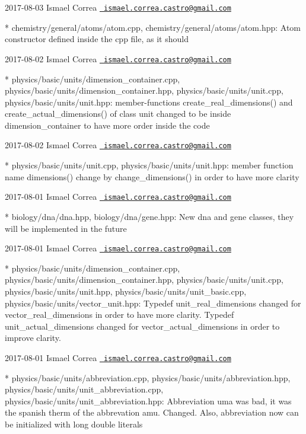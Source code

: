  2017-\/08-\/03 Ismael Correa \href{mailto:ismael.correa.castro@gmail.com}{\texttt{ ismael.\+correa.\+castro@gmail.\+com}} \begin{DoxyVerb}* chemistry/general/atoms/atom.cpp,
chemistry/general/atoms/atom.hpp: Atom constructor defined inside
the cpp file, as it should
\end{DoxyVerb}
 2017-\/08-\/02 Ismael Correa \href{mailto:ismael.correa.castro@gmail.com}{\texttt{ ismael.\+correa.\+castro@gmail.\+com}} \begin{DoxyVerb}* physics/basic/units/dimension_container.cpp,
physics/basic/units/dimension_container.hpp,
physics/basic/units/unit.cpp, physics/basic/units/unit.hpp: 
member-functions create_real_dimensions() and
create_actual_dimensions() of class unit changed to be inside
dimension_container to have more order inside the code
\end{DoxyVerb}
 2017-\/08-\/02 Ismael Correa \href{mailto:ismael.correa.castro@gmail.com}{\texttt{ ismael.\+correa.\+castro@gmail.\+com}} \begin{DoxyVerb}* physics/basic/units/unit.cpp, physics/basic/units/unit.hpp: member
function name dimensions() change by change_dimensions() in order to
have more clarity
\end{DoxyVerb}
 2017-\/08-\/01 Ismael Correa \href{mailto:ismael.correa.castro@gmail.com}{\texttt{ ismael.\+correa.\+castro@gmail.\+com}} \begin{DoxyVerb}* biology/dna/dna.hpp, biology/dna/gene.hpp: New dna and gene
classes, they will be implemented in the future
\end{DoxyVerb}
 2017-\/08-\/01 Ismael Correa \href{mailto:ismael.correa.castro@gmail.com}{\texttt{ ismael.\+correa.\+castro@gmail.\+com}} \begin{DoxyVerb}* physics/basic/units/dimension_container.cpp,
physics/basic/units/dimension_container.hpp,
physics/basic/units/unit.cpp, physics/basic/units/unit.hpp,
physics/basic/units/unit_basic.cpp,
physics/basic/units/vector_unit.hpp: Typedef unit_real_dimensions
changed for vector_real_dimensions in order to have more clarity.
Typedef unit_actual_dimensions changed for vector_actual_dimensions
in order to improve clarity.
\end{DoxyVerb}
 2017-\/08-\/01 Ismael Correa \href{mailto:ismael.correa.castro@gmail.com}{\texttt{ ismael.\+correa.\+castro@gmail.\+com}} \begin{DoxyVerb}* physics/basic/units/abbreviation.cpp,
physics/basic/units/abbreviation.hpp,
physics/basic/units/unit_abbreviation.cpp,
physics/basic/units/unit_abbreviation.hpp: Abbreviation uma was bad,
it was the spanish therm of the abbrevation amu. Changed. Also,
abbreviation now can be initialized with long double literals
\end{DoxyVerb}
